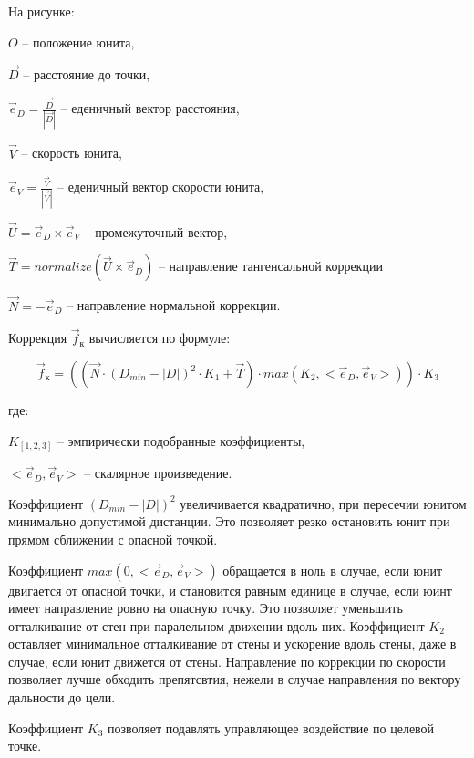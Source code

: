 \begin{center}

\end{center}

На рисунке:

$O$ -- положение юнита,

$\vec D$ -- расстояние до точки,

$\vec e_D = \frac{\vec D}{|\vec D|}$ -- еденичный вектор расстояния,

$\vec V$ -- скорость юнита,

$\vec e_V = \frac{\vec V}{|\vec V|}$ -- еденичный вектор скорости юнита,

$\vec U = \vec e_D \times \vec e_V$ -- промежуточный вектор,

$\vec T = normalize(\vec U \times \vec e_D)$ -- направление тангенсальной коррекции

$\vec N = -\vec e_D$ -- направление нормальной коррекции.

\newpage
Коррекция $\vec f_{\text{к}}$ вычисляется по формуле:

$$\vec f_{\text{к}} = ( ( \vec N \cdot ( D_{min} - |D| )^2 \cdot K_1 + \vec T ) \cdot max( K_2, < \vec e_D, \vec e_V > ) ) \cdot K_3 $$

где:

$K_{[1,2,3]}$ -- эмпирически подобранные коэффициенты, 

$< \vec e_D, \vec e_V >$ -- скалярное произведение.

Коэффициент $(D_{min} - |D|)^2$ увеличивается квадратично,
при пересечии юнитом минимально допустимой дистанции. Это позволяет
резко остановить юнит при прямом сближении с опасной точкой.

Коэффициент $max(0, < \vec e_D, \vec e_V > )$ обращается в ноль в случае,
если юнит двигается от опасной точки, и становится равным единице в случае,
если юинт имеет направление ровно на опасную точку. Это позволяет уменьшить
отталкивание от стен при паралельном движении вдоль них. Коэффициент $K_2$ оставляет
минимальное отталкивание от стены и ускорение вдоль стены, даже в случае, если
юнит движется от стены. Направление по коррекции по скорости позволяет лучше
обходить препятсвтия, нежели в случае направления по вектору дальности до цели.

Коэффициент $K_3$ позволяет подавлять управляющее воздействие по целевой \lb точке.

